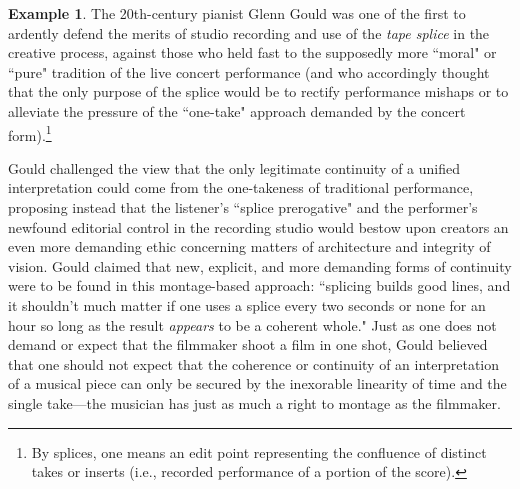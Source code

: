 \documentclass[a4paper]{book}
\theoremstyle{definition}
\newtheorem{example}{Example}[section]
\theoremstyle{definition}
\theoremstyle{definition}
\theoremstyle{theorem}
\theoremstyle{definition}
\begin{document}
\begin{example}
	The 20th-century pianist Glenn Gould was one of the first to ardently defend the merits of studio recording and use of the \textit{tape splice} in the creative process, against those who held fast to the supposedly more ``moral" or ``pure" tradition of the live concert performance (and who accordingly thought that the only purpose of the splice would be to rectify performance mishaps or to alleviate the pressure of the ``one-take" approach demanded by the concert form).\footnote{By splices, one means an edit point representing the confluence of distinct takes or inserts (i.e., recorded performance of a portion of the score).} \par 
	Gould challenged the view that the only legitimate continuity of a unified interpretation could come from the one-takeness of traditional performance, proposing instead that the listener's ``splice prerogative" and the performer's newfound editorial control in the recording studio would bestow upon creators an even more demanding ethic concerning matters of architecture and integrity of vision. Gould claimed that new, explicit, and more demanding forms of continuity were to be found in this montage-based approach: ``splicing builds good lines, and it shouldn't much matter if one uses a splice every two seconds or none for an hour so long as the result \textit{appears} to be a coherent whole." Just as one does not demand or expect that the filmmaker shoot a film in one shot, Gould believed that one should not expect that the coherence or continuity of an interpretation of a musical piece can only be secured by the inexorable linearity of time and the single take---the musician has just as much a right to montage as the filmmaker.  \par 

\end{example}
\end{document}
